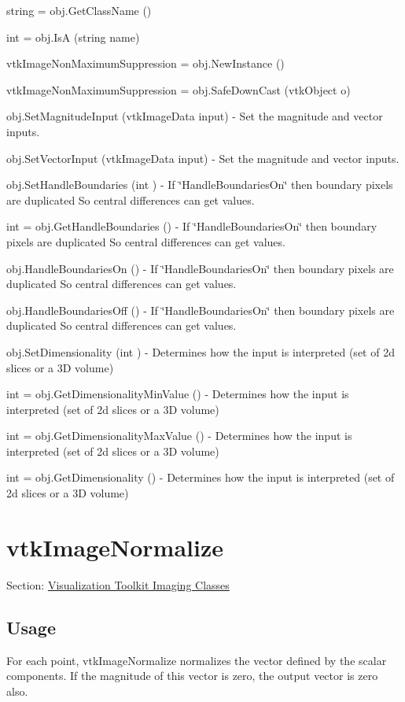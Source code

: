 \begin{DoxyItemize}
\item {\ttfamily string = obj.\-Get\-Class\-Name ()}  
\item {\ttfamily int = obj.\-Is\-A (string name)}  
\item {\ttfamily vtk\-Image\-Non\-Maximum\-Suppression = obj.\-New\-Instance ()}  
\item {\ttfamily vtk\-Image\-Non\-Maximum\-Suppression = obj.\-Safe\-Down\-Cast (vtk\-Object o)}  
\item {\ttfamily obj.\-Set\-Magnitude\-Input (vtk\-Image\-Data input)} -\/ Set the magnitude and vector inputs.  
\item {\ttfamily obj.\-Set\-Vector\-Input (vtk\-Image\-Data input)} -\/ Set the magnitude and vector inputs.  
\item {\ttfamily obj.\-Set\-Handle\-Boundaries (int )} -\/ If \char`\"{}\-Handle\-Boundaries\-On\char`\"{} then boundary pixels are duplicated So central differences can get values.  
\item {\ttfamily int = obj.\-Get\-Handle\-Boundaries ()} -\/ If \char`\"{}\-Handle\-Boundaries\-On\char`\"{} then boundary pixels are duplicated So central differences can get values.  
\item {\ttfamily obj.\-Handle\-Boundaries\-On ()} -\/ If \char`\"{}\-Handle\-Boundaries\-On\char`\"{} then boundary pixels are duplicated So central differences can get values.  
\item {\ttfamily obj.\-Handle\-Boundaries\-Off ()} -\/ If \char`\"{}\-Handle\-Boundaries\-On\char`\"{} then boundary pixels are duplicated So central differences can get values.  
\item {\ttfamily obj.\-Set\-Dimensionality (int )} -\/ Determines how the input is interpreted (set of 2d slices or a 3\-D volume)  
\item {\ttfamily int = obj.\-Get\-Dimensionality\-Min\-Value ()} -\/ Determines how the input is interpreted (set of 2d slices or a 3\-D volume)  
\item {\ttfamily int = obj.\-Get\-Dimensionality\-Max\-Value ()} -\/ Determines how the input is interpreted (set of 2d slices or a 3\-D volume)  
\item {\ttfamily int = obj.\-Get\-Dimensionality ()} -\/ Determines how the input is interpreted (set of 2d slices or a 3\-D volume)  
\end{DoxyItemize}\hypertarget{vtkimaging_vtkimagenormalize}{}\section{vtk\-Image\-Normalize}\label{vtkimaging_vtkimagenormalize}
Section\-: \hyperlink{sec_vtkimaging}{Visualization Toolkit Imaging Classes} \hypertarget{vtkwidgets_vtkxyplotwidget_Usage}{}\subsection{Usage}\label{vtkwidgets_vtkxyplotwidget_Usage}
For each point, vtk\-Image\-Normalize normalizes the vector defined by the scalar components. If the magnitude of this vector is zero, the output vector is zero also.

